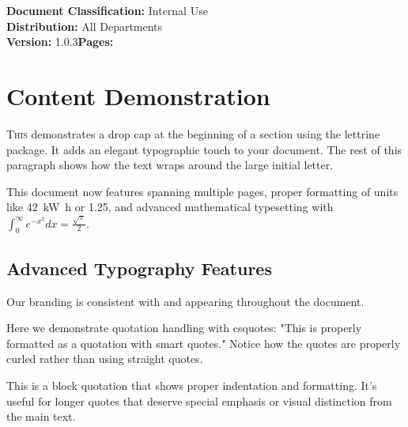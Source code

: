 \documentclass[a4paper,11pt]{article}
\newcommand{\companyName}{Lagen}
\newcommand{\documentVersion}{1.0.3}
\newcommand{\documentClassification}{Internal Use}
\begin{document}
\vfill
\begin{center}
\color{textgray}\footnotesize\sffamily
\textbf{Document Classification:} \documentClassification\\
\textbf{Distribution:} All Departments\\
\textbf{Version:} \documentVersion \quad \textbf{Pages:} \pageref{LastPage}
\end{center}

\newpage

\tableofcontents
\newpage


\section{Content Demonstration}
\label{sec:demonstration}

\lettrine[lines=3, loversize=0.1]{T}{his} demonstrates a drop cap at the beginning of a section using the lettrine package. It adds an elegant typographic touch to your document. The rest of this paragraph shows how the text wraps around the large initial letter.

This document now features  spanning multiple pages, proper formatting of units like \SI{42}{\kilo\watt\hour} or \SI{1.25}{\USD}, and advanced mathematical typesetting with $\displaystyle\int_{0}^{\infty} e^{-x^2} dx = \frac{\sqrt{\pi}}{2}$.

\subsection{Advanced Typography Features}

Our branding is consistent with \brandname{\companyName} and  appearing throughout the document. 

Here we demonstrate quotation handling with csquotes: "This is properly formatted as a quotation with smart quotes." Notice how the quotes are properly curled rather than using straight quotes.

\begin{displayquote}
This is a block quotation that shows proper indentation and formatting. It's useful for longer quotes that deserve special emphasis or visual distinction from the main text.
\end{displayquote}
\end{document}
